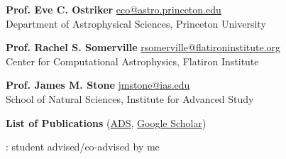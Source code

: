 \documentclass[12pt]{article}
\begin{document}

{\small {\bf Prof. Eve C. Ostriker}
\url{eco@astro.princeton.edu}\\
Department of Astrophysical Sciences, Princeton University}


{\small {\bf Prof. Rachel S. Somerville}
\url{rsomerville@flatironinstitute.org}\\
Center for Computational Astrophysics, Flatiron Institute}


{\small {\bf Prof. James M. Stone}
\url{jmstone@ias.edu}\\
School of Natural Sciences, Institute for Advanced Study}


\newpage
\begin{center}
{\large \bf List of Publications}
(\href{\adsurl}{ADS}, \href{\googleurl}{Google Scholar})\\

\end{center}



\begin{itemize}[itemsep=0pt,topsep=\parskip]
\small 
\end{itemize}




{: student advised/co-advised by me}
\begin{itemize}[itemsep=0pt,topsep=\parskip]
\small 
\end{itemize}





\begin{itemize}[itemsep=0pt,topsep=\parskip]
\small 
\end{itemize}
\end{document}
